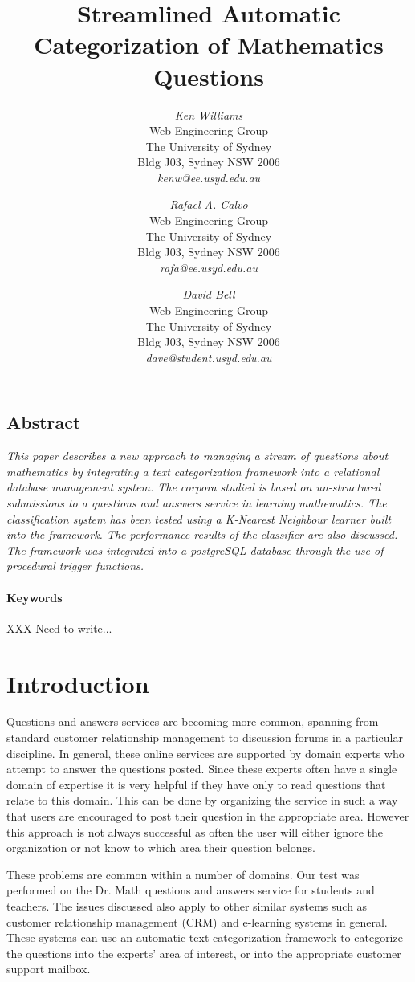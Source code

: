\documentclass[twocolumn]{article}
\title{Streamlined Automatic Categorization of Mathematics Questions}
\author{
{\em Ken Williams}\\[1ex]
Web Engineering Group\\
The University of Sydney\\
Bldg J03, Sydney NSW 2006\\[1ex]
{\em kenw@ee.usyd.edu.au}
\and
{\em Rafael A. Calvo}\\[1ex]
Web Engineering Group\\
The University of Sydney\\
Bldg J03, Sydney NSW 2006\\[1ex]
{\em rafa@ee.usyd.edu.au}
\and
{\em David Bell}\\[1ex]
Web Engineering Group\\
The University of Sydney\\
Bldg J03, Sydney NSW 2006\\[1ex]
{\em dave@student.usyd.edu.au}
}
\begin{document}
\maketitle
\thispagestyle{empty}


\subsection*{\centering Abstract}
\noindent
{\it 
This paper describes a new approach to managing a stream of questions about 
mathematics by integrating a text categorization framework into a relational database 
management system. The corpora studied is based on un-structured submissions to a 
questions and answers service in learning mathematics. The classification system has 
been tested using a K-Nearest Neighbour learner built into the framework. The 
performance results of the classifier are also discussed. The framework was integrated 
into a postgreSQL database through the use of procedural trigger functions.
}

\paragraph{Keywords} 
XXX Need to write...



\section{Introduction}

Questions and answers services are becoming more common, spanning from standard 
customer relationship management to discussion forums in a particular discipline. In 
general, these online services are supported by domain experts who attempt to answer 
the questions posted. Since these experts often have a single domain of expertise it is 
very helpful if they have only to read questions that relate to this domain. This can be 
done by organizing the service in such a way that users are encouraged to post their 
question in the appropriate area. However this approach is not always successful as 
often the user will either ignore the organization or not know to which area their 
question belongs. 

These problems are common within a number of domains. Our test was performed on 
the Dr. Math questions and answers service for students and teachers. The issues 
discussed also apply to other similar systems such as customer relationship 
management (CRM) and e-learning systems in general. These systems can use an 
automatic text categorization framework to categorize the questions into the experts' 
area of interest, or into the appropriate customer support mailbox. 
\end{document}
